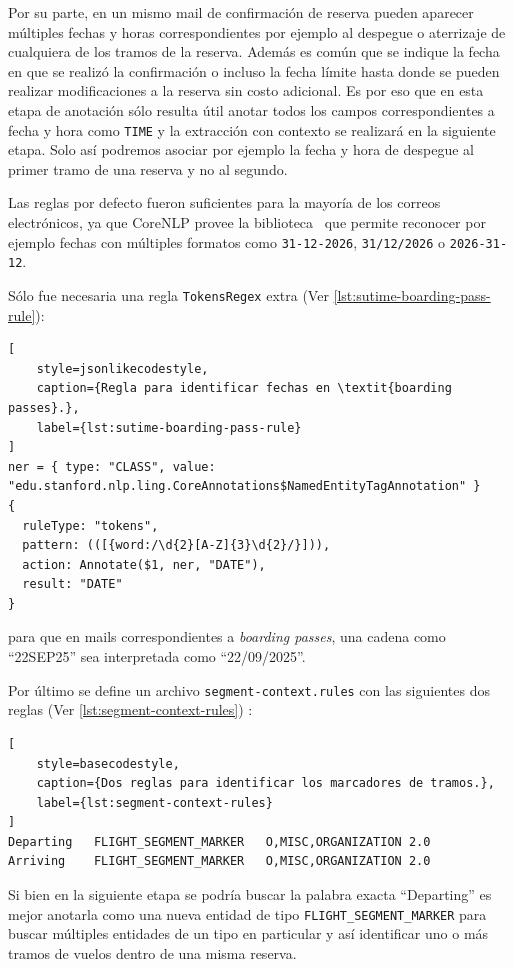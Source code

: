 Por su parte, en un mismo mail de confirmación de reserva pueden aparecer múltiples fechas y horas correspondientes por
ejemplo al despegue o aterrizaje de cualquiera de los tramos de la reserva.
Además es común que se indique la fecha en que se realizó la confirmación o incluso la fecha límite hasta donde se
pueden realizar modificaciones a la reserva sin costo adicional.
Es por eso que en esta etapa de anotación sólo resulta útil anotar todos los campos correspondientes a fecha y hora como
\texttt{TIME} y la extracción con contexto se realizará en la siguiente etapa.
Solo así podremos asociar por ejemplo la fecha y hora de despegue al primer tramo de una reserva y no al segundo.

Las reglas por defecto fueron suficientes para la mayoría de los correos electrónicos, ya que CoreNLP provee la
biblioteca~\cite{stanford-sutime} que permite reconocer por ejemplo fechas con
múltiples formatos como \texttt{31{-}12{-}2026}, \texttt{31/12/2026} o
\texttt{2026{-}31{-}12}.

Sólo fue necesaria una regla \texttt{TokensRegex} extra (Ver \autoref{lst:sutime-boarding-pass-rule}):

\begin{lstlisting}[
    style=jsonlikecodestyle,
    caption={Regla para identificar fechas en \textit{boarding passes}.},
    label={lst:sutime-boarding-pass-rule}
]
ner = { type: "CLASS", value: "edu.stanford.nlp.ling.CoreAnnotations$NamedEntityTagAnnotation" }
{
  ruleType: "tokens",
  pattern: (([{word:/\d{2}[A-Z]{3}\d{2}/}])),
  action: Annotate($1, ner, "DATE"),
  result: "DATE"
}
\end{lstlisting}

para que en mails correspondientes a \textit{boarding passes}, una cadena como ``22SEP25'' sea interpretada como
``22/09/2025''.

Por último se define un archivo \texttt{segment-context.rules} con las siguientes dos reglas
(Ver \autoref{lst:segment-context-rules})
:
\begin{lstlisting}[
    style=basecodestyle,
    caption={Dos reglas para identificar los marcadores de tramos.},
    label={lst:segment-context-rules}
]
Departing	FLIGHT_SEGMENT_MARKER	O,MISC,ORGANIZATION	2.0
Arriving	FLIGHT_SEGMENT_MARKER	O,MISC,ORGANIZATION	2.0
\end{lstlisting}

Si bien en la siguiente etapa se podría buscar la palabra exacta ``Departing'' es mejor anotarla como una nueva entidad
de tipo \texttt{FLIGHT\_SEGMENT\_MARKER} para buscar múltiples entidades de un tipo en particular y así identificar uno
o más tramos de vuelos dentro de una misma reserva.

